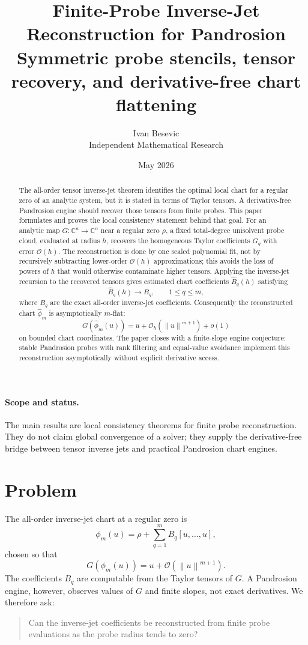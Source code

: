 \documentclass[11pt]{article}
\title{Finite-Probe Inverse-Jet Reconstruction for Pandrosion\\[3pt]
\large Symmetric probe stencils, tensor recovery, and derivative-free chart flattening}
\author{Ivan Besevic\\Independent Mathematical Research}
\date{May 2026}
\newcommand{\C}{\mathbb C}
\newcommand{\Oterm}{\mathcal O}
\newcommand{\norm}[1]{\left\lVert #1\right\rVert}
\begin{document}
\maketitle

\begin{abstract}
The all-order tensor inverse-jet theorem identifies the optimal local chart for a regular zero of an analytic system, but it is stated in terms of Taylor tensors. A derivative-free Pandrosion engine should recover those tensors from finite probes. This paper formulates and proves the local consistency statement behind that goal. For an analytic map \(G:\C^n\to\C^n\) near a regular zero \(\rho\), a fixed total-degree unisolvent probe cloud, evaluated at radius \(h\), recovers the homogeneous Taylor coefficients \(G_q\) with error \(\Oterm(h)\). The reconstruction is done by one scaled polynomial fit, not by recursively subtracting lower-order \(\Oterm(h)\) approximations; this avoids the loss of powers of \(h\) that would otherwise contaminate higher tensors. Applying the inverse-jet recursion to the recovered tensors gives estimated chart coefficients \(\widehat B_q(h)\) satisfying
\[
        \widehat B_q(h)\longrightarrow B_q,\qquad 1\le q\le m,
\]
where \(B_q\) are the exact all-order inverse-jet coefficients. Consequently the reconstructed chart \(\widehat\phi_m\) is asymptotically \(m\)-flat:
\[
        G(\widehat\phi_m(u))=u+\Oterm_h(\norm{u}^{m+1})+o(1)
\]
on bounded chart coordinates. The paper closes with a finite-slope engine conjecture: stable Pandrosion probes with rank filtering and equal-value avoidance implement this reconstruction asymptotically without explicit derivative access.
\end{abstract}

\paragraph{Scope and status.}
The main results are local consistency theorems for finite probe reconstruction. They do not claim global convergence of a solver; they supply the derivative-free bridge between tensor inverse jets and practical Pandrosion chart engines.

\section{Problem}

The all-order inverse-jet chart at a regular zero is
\[
        \phi_m(u)=\rho+\sum_{q=1}^m B_q[u,\ldots,u],
\]
chosen so that
\[
        G(\phi_m(u))=u+\Oterm(\norm{u}^{m+1}).
\]
The coefficients \(B_q\) are computable from the Taylor tensors of \(G\). A Pandrosion engine, however, observes values of \(G\) and finite slopes, not exact derivatives. We therefore ask:
\begin{quote}
Can the inverse-jet coefficients be reconstructed from finite probe evaluations as the probe radius tends to zero?
\end{quote}
\end{document}
